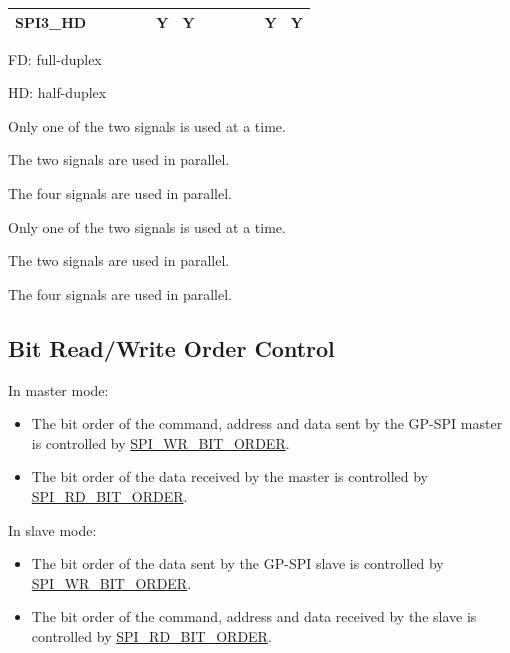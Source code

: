 \documentclass[main\_\_EN.tex]{subfiles}
\begin{document}
\begin{landscape}
\begin{table}[H]
\begin{threeparttable}
\begin{tabular}{ |p{2.0cm} |c|c|c|c|c|c|c|c|c|c|c|c| }
SPI3\_HD                   &         &         &         &         & Y\tnote{5}      & Y      &         &        &         &         & Y\tnote{8}       & Y      \\ \hline
\end{tabular}
        \begin{tablenotes}
                \item[1] FD: full-duplex
                \item[2] HD: half-duplex
                \item[3] Only one of the two signals is used at a time.
                \item[4] The two signals are used in parallel.
                \item[5] The four signals are used in parallel.
                \item[6] Only one of the two signals is used at a time.
                \item[7] The two signals are used in parallel.
                \item[8] The four signals are used in parallel.
        \end{tablenotes}
     \end{threeparttable}
    \end{table}

\end{landscape}

\subsection{Bit Read/Write Order Control}
In master mode:

\begin{itemize}
    \item The bit order of the command, address and data sent by the GP-SPI master is controlled by \hyperref[fielddesc:SPIWRBITORDER]{SPI\_WR\_BIT\_ORDER}.
    \item The bit order of the data received by the master is controlled by \hyperref[fielddesc:SPIRDBITORDER]{SPI\_RD\_BIT\_ORDER}.
\end{itemize}


In slave mode:

\begin{itemize}
    \item The bit order of the data sent by the GP-SPI slave is controlled by \hyperref[fielddesc:SPIWRBITORDER]{SPI\_WR\_BIT\_ORDER}.
    \item The bit order of the command, address and data received by the slave is controlled by \hyperref[fielddesc:SPIRDBITORDER]{SPI\_RD\_BIT\_ORDER}.
\end{itemize}
\end{document}
